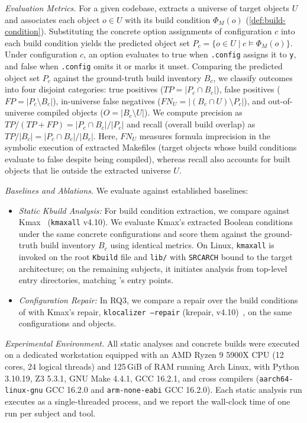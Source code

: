 \documentclass[acmsmall,screen,review,anonymous,nonacm]{acmart}
\begin{document}
\emph{Evaluation Metrics.}
For a given codebase, \tool{} extracts a universe of target objects $U$ and associates each object $o \in U$ with its build condition $\Phi_M(o)$ (\autoref{def:build-condition}).
Substituting the concrete option assignments of configuration $c$ into each build condition yields the predicted object set $P_c = \{o \in U \mid c \models \Phi_M(o)\}$.
Under configuration $c$, an option evaluates to true when \texttt{.config} assigns it to \texttt{y}, and false when \texttt{.config} omits it or marks it unset.
Comparing the predicted object set $P_c$ against the ground-truth build inventory $B_c$, we classify outcomes into four disjoint categories: true positives ($TP = |P_c \cap B_c|$), false positives ($FP = |P_c \setminus B_c|$), in-universe false negatives ($FN_U = |(B_c \cap U) \setminus P_c|$), and out-of-universe compiled objects ($O = |B_c \setminus U|$).
We compute precision as $TP / (TP + FP) = |P_c \cap B_c| / |P_c|$ and recall (overall build overlap) as $TP / |B_c| = |P_c \cap B_c| / |B_c|$.
Here, $FN_U$ measures formula imprecision in the symbolic execution of extracted Makefiles (target objects whose build conditions evaluate to false despite being compiled), whereas recall also accounts for built objects that lie outside the extracted universe $U$.

\emph{Baselines and Ablations.}
We evaluate \tool{} against established baselines:
\begin{itemize}[leftmargin=1.5em]
  \item \emph{Static Kbuild Analysis:} For build condition extraction, we compare \tool{} against Kmax~\cite{gazzillo2017kmax} (\texttt{kmaxall} v4.10). We evaluate Kmax's extracted Boolean conditions under the same concrete configurations and score them against the ground-truth build inventory $B_c$ using identical metrics. On Linux, \texttt{kmaxall} is invoked on the root \texttt{Kbuild} file and \texttt{lib/} with \texttt{SRCARCH} bound to the target architecture; on the remaining subjects, it initiates analysis from top-level entry directories, matching \tool{}'s entry points.
  \item \emph{Configuration Repair:} In RQ3, we compare a repair over the build conditions of \tool{} with Kmax's repair, \texttt{klocalizer --repair} (krepair, v4.10)~\cite{yildiran2024krepair}, on the same configurations and objects.
\end{itemize}

\emph{Experimental Environment.}
All static analyses and concrete builds were executed on a dedicated workstation equipped with an AMD Ryzen 9 5900X CPU (12 cores, 24 logical threads) and 125\,GiB of RAM running Arch Linux, with Python 3.10.19, Z3 5.3.1, GNU Make 4.4.1, GCC 16.2.1, and cross compilers (\texttt{aarch64-linux-gnu} GCC 16.2.0 and \texttt{arm-none-eabi} GCC 16.2.0).
Each static analysis run executes as a single-threaded process, and we report the wall-clock time of one run per subject and tool.
\end{document}

